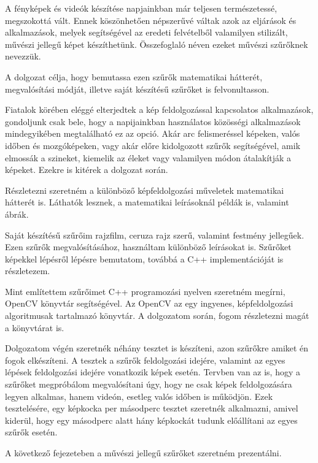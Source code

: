 

A fényképek és videók készítése napjainkban már teljesen természetessé, megszokottá vált. Ennek köszönhetően népszerűvé váltak azok az eljárások és alkalmazások, melyek segítségével az eredeti felvételből valamilyen stilizált, művészi jellegű képet készíthetünk. Összefoglaló néven ezeket művészi szűrőknek nevezzük.

A dolgozat célja, hogy bemutassa ezen szűrők matematikai hátterét, megvalósítási módját, illetve saját készítésű szűrőket is felvonultasson.

Fiatalok körében eléggé elterjedtek a kép feldolgozással kapcsolatos alkalmazások, gondoljunk csak bele, hogy a napijainkban használatos közösségi alkalmazások mindegyikében megtalálható ez az opció. Akár arc felismeréssel képeken, valós időben és mozgóképeken, vagy akár előre kidolgozott szűrők segítségével, amik elmossák a szineket, kiemelik az éleket vagy valamilyen módon átalakítják a képeket. Ezekre is kitérek a dolgozat során.

Részletezni szeretném a különböző képfeldolgozási műveletek matematikai hátterét is. Láthatók lesznek, a matematikai leírásoknál példák is, valamint ábrák.

Saját készítésű szűrőim rajzfilm, ceruza rajz szerű, valamint festmény jellegűek. Ezen szűrők megvalósításához, használtam különböző leírásokat is. Szűrőket képekkel lépésről lépésre bemutatom, továbbá a C++ implementációját is részletezem.

Mint említettem szűrőimet C++ programozási nyelven szeretném megírni, OpenCV könyvtár segítségével. Az OpenCV az egy ingyenes, képfeldolgozási algoritmusak tartalmazó könyvtár. A dolgozatom során, fogom részletezni magát a könyvtárat is.

Dolgozatom végén szeretnék néhány tesztet is készíteni, azon szűrőkre amiket én fogok elkészíteni. A tesztek a szűrők feldolgozási idejére, valamint az egyes lépések feldolgozási idejére vonatkozik képek esetén. Tervben van az is, hogy a szűrőket megpróbálom megvalósítani úgy, hogy ne csak képek feldolgozására legyen alkalmas, hanem videón, esetleg valós időben is működjön. Ezek tesztelésére, egy képkocka per másodperc tesztet szeretnék alkalmazni, amivel kiderül, hogy egy másodperc alatt hány képkockát tudunk előállítani az egyes szűrők esetén.

A következő fejezeteben a művészi jellegű szűrőket szeretném prezentálni.
